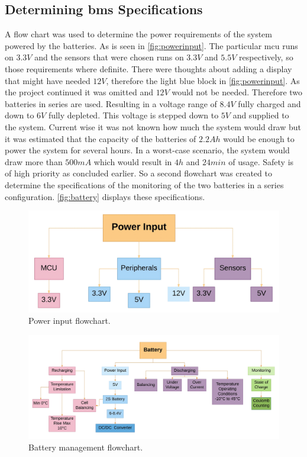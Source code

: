 \subsection{Determining \gls{bms} Specifications}
A flow chart was used to determine the power requirements of the system powered by the batteries. As is seen in \autoref{fig:powerinput}. The particular \gls{mcu} runs on $3.3V$ and the sensors that were chosen runs on $3.3V$ and $5.5V$ respectively, so those requirements where definite. There were thoughts about adding a display that might have needed $12V$, therefore the light blue block in \autoref{fig:powerinput}. As the project continued it was omitted and $12V$ would not be needed. Therefore two batteries in series are used. Resulting in a voltage range of $8.4V$ fully charged and down to $6V$ fully depleted. This voltage is stepped down to $5V$ and supplied to the system.
Current wise it was not known how much the system would draw but it was estimated that the capacity of the batteries of $2.2Ah$ would be enough to power the system for several hours.
In a worst-case scenario, the system would draw more than $500mA$ which would result in $4h$ and $24min$ of usage.
Safety is of high priority as concluded earlier. So a second flowchart was created to determine the specifications of the monitoring of the two batteries in a series configuration. \autoref{fig:battery} displays these specifications.

\begin{figure}[H]
	\centering
	\includegraphics[width=\textwidth]{Figures/powerinput.png}
	\caption{Power input flowchart.}
	\label{fig:powerinput}
\end{figure}

\begin{figure}[H]
	\centering
	\includegraphics[width=\textwidth]{Figures/battery.png}
	\caption{Battery management flowchart.}
	\label{fig:battery}
\end{figure}


